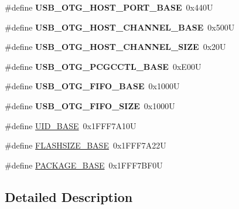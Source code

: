 \begin{DoxyCompactItemize}
\item 
\mbox{\label{group___peripheral__memory__map_ga42f433cb79ca69f09972e690fda6737a}} 
\#define {\bfseries U\+S\+B\+\_\+\+O\+T\+G\+\_\+\+H\+O\+S\+T\+\_\+\+P\+O\+R\+T\+\_\+\+B\+A\+SE}~0x440U
\item 
\mbox{\label{group___peripheral__memory__map_ga942c8c5241b80fbcf638fea0fa18bebd}} 
\#define {\bfseries U\+S\+B\+\_\+\+O\+T\+G\+\_\+\+H\+O\+S\+T\+\_\+\+C\+H\+A\+N\+N\+E\+L\+\_\+\+B\+A\+SE}~0x500U
\item 
\mbox{\label{group___peripheral__memory__map_ga266cb1dbb50faf447f9c15d2ee93a522}} 
\#define {\bfseries U\+S\+B\+\_\+\+O\+T\+G\+\_\+\+H\+O\+S\+T\+\_\+\+C\+H\+A\+N\+N\+E\+L\+\_\+\+S\+I\+ZE}~0x20U
\item 
\mbox{\label{group___peripheral__memory__map_gaa9766975aca084c257730879568bc7cf}} 
\#define {\bfseries U\+S\+B\+\_\+\+O\+T\+G\+\_\+\+P\+C\+G\+C\+C\+T\+L\+\_\+\+B\+A\+SE}~0x\+E00U
\item 
\mbox{\label{group___peripheral__memory__map_gace340350802904868673f0e839c4fa04}} 
\#define {\bfseries U\+S\+B\+\_\+\+O\+T\+G\+\_\+\+F\+I\+F\+O\+\_\+\+B\+A\+SE}~0x1000U
\item 
\mbox{\label{group___peripheral__memory__map_ga8781c4b2406c740d9fe540737a6a0188}} 
\#define {\bfseries U\+S\+B\+\_\+\+O\+T\+G\+\_\+\+F\+I\+F\+O\+\_\+\+S\+I\+ZE}~0x1000U
\item 
\#define \mbox{\hyperlink{group___peripheral__memory__map_ga664eda42b83c919b153b07b23348be67}{U\+I\+D\+\_\+\+B\+A\+SE}}~0x1\+F\+F\+F7\+A10U
\item 
\#define \mbox{\hyperlink{group___peripheral__memory__map_ga776d985f2d4d40b588ef6ca9d573af78}{F\+L\+A\+S\+H\+S\+I\+Z\+E\+\_\+\+B\+A\+SE}}~0x1\+F\+F\+F7\+A22U
\item 
\#define \mbox{\hyperlink{group___peripheral__memory__map_ga88fc8a2912bd1ac72c6eddb456f0b096}{P\+A\+C\+K\+A\+G\+E\+\_\+\+B\+A\+SE}}~0x1\+F\+F\+F7\+B\+F0U
\end{DoxyCompactItemize}


\subsection{Detailed Description}



